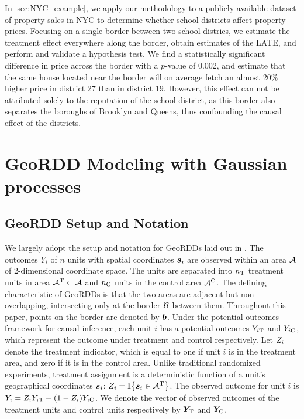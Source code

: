 \documentclass[12pt]{article}
\begin{document}
In \autoref{sec:NYC_example}, we apply our methodology to a publicly available dataset of property sales in NYC to determine whether school districts affect property prices.
Focusing on a single border between two school districs, we estimate the treatment effect everywhere along the border, obtain estimates of the LATE, and perform and validate a hypothesis test.
We find a statistically significant difference in price across the border with a \(p\)-value of 0.002, and estimate that the same house located near the border will on average fetch an almost 20\% higher price in district 27 than in district 19.
However, this effect can not be attributed solely to the reputation of the school district, as this border also separates the boroughs of Brooklyn and Queens, thus confounding the causal effect of the districts.

\section{GeoRDD Modeling with Gaussian processes}
\label{sec:geordd_model}

\subsection{GeoRDD Setup and Notation}
We largely adopt the setup and notation for GeoRDDs laid out in \cite{keele_titiunik_2015}.
The outcomes \(Y_i\) of \(n\) units with spatial coordinates \(\bm{s}_i\) are observed within an area \(\mathcal{A}\) of 2-dimensional coordinate space.
The units are separated into \(n_{\mathrm{T}}\) treatment units in area \(\mathcal{A}{}^{\mathrm{T}} \subset \mathcal{A}\)
and \(n_{\mathrm{C}}\) units in the control area \(\mathcal{A}{}^{\mathrm{C}}\).
The defining characteristic of GeoRDDs is that the two areas are adjacent but non-overlapping, intersecting only at the border \(\mathcal{B}\) between them.
Throughout this paper, points on the border are denoted by \(\bm{b}\).
Under the potential outcomes framework for causal inference, each unit \(i\) has a potential outcomes \(Y_{i\mathrm{T}}\) and \(Y_{i\mathrm{C}}\), which represent the outcome under treatment and control respectively.
Let \(Z_i\) denote the treatment indicator, which is equal to one if unit \(i\) is in the treatment area, and zero if it is in the control area.
Unlike traditional randomized experiments, treatment assignment is a deterministic function of a unit's geographical coordinates \(\bm{s}_i\): \(\treatind_i = \Ind\cbr{\svec_i \in \treatarea}\).
The observed outcome for unit \(i\) is \(Y_i = Z_i Y_{i\mathrm{T}} + (1 - Z_i) Y_{i\mathrm{C}}\).
We denote the vector of observed outcomes of the treatment units and control units respectively by \(\bm{Y}_{\mathrm{T}}\) and \(\bm{Y}_{\mathrm{C}}\).
\end{document}
